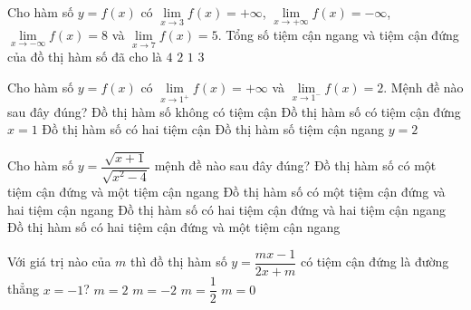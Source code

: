 \begin{ex}%
    Cho hàm số $y=f(x)$ có $\lim\limits_{x \rightarrow 3} f(x)=+\infty$, $\lim\limits_{x \rightarrow+\infty} f(x)=-\infty$, $\lim\limits_{x \rightarrow-\infty} f(x)=8$ và $\lim\limits_{x \rightarrow 7} f(x)=5 $. Tổng số tiệm cận ngang và tiệm cận đứng của đồ thị hàm số đã cho là
    \choice
    {$4$}
    {\True $2$}
    {$1$}
    {$3$}
\end{ex}
\begin{ex}%
    Cho hàm số $y=f(x)$ có $\lim\limits_{x \rightarrow 1^{+}} f(x)=+\infty$ và $\lim\limits_{x \rightarrow 1^{-}} f(x)=2$. Mệnh đề nào sau đây đúng?
    \choice
    {Đồ thị hàm số không có tiệm cận}
    {\True Đồ thị hàm số có tiệm cận đứng $x=1$}
    {Đồ thị hàm số có hai tiệm cận}
    {Đồ thị hàm số tiệm cận ngang $y=2$}
\end{ex}
\begin{ex}%
    Cho hàm số $y=\dfrac{\sqrt{x+1}}{\sqrt{x^2-4}}$ mệnh đề nào sau đây đúng?
    \choice
    {\True Đồ thị hàm số có một tiệm cận đứng và một tiệm cận ngang}
    {Đồ thị hàm số có một tiệm cận đứng và hai tiệm cận ngang}
    {Đồ thị hàm số có hai tiệm cận đứng và hai tiệm cận ngang}
    {Đồ thị hàm số có hai tiệm cận đứng và một tiệm cận ngang}
    \loigiai{
        Tập xác định $\mathscr{D}=[-1;+\infty) \setminus \{2\}$. \\
        Đồ thị hàm số có một tiệm cận đứng $x=2$, tiệm cận ngang là $y=0$.
    }
\end{ex}
\begin{ex}%
    Với giá trị nào của $m$ thì đồ thị hàm số $y=\dfrac{mx-1}{2x+m}$ có tiệm cận đứng là đường thẳng $x=-1$?
    \choice
    {$m=2$}
    {\True $m=-2$}
    {$m=\dfrac{1}{2}$}
    {$m=0$}
\end{ex}
